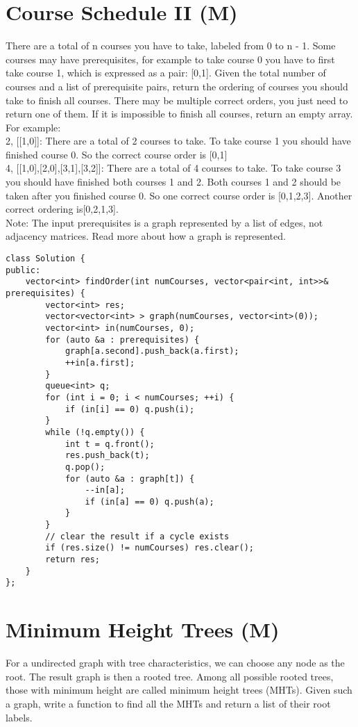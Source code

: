 \section{Course Schedule II (M)}
There are a total of n courses you have to take, labeled from 0 to n - 1. Some courses may have prerequisites, for example to take course 0 you have to first take course 1, which is expressed as a pair: [0,1]. Given the total number of courses and a list of prerequisite pairs, return the ordering of courses you should take to finish all courses. There may be multiple correct orders, you just need to return one of them. If it is impossible to finish all courses, return an empty array.\\

For example:\\
2, [[1,0]]: There are a total of 2 courses to take. To take course 1 you should have finished course 0. So the correct course order is [0,1]\\
4, [[1,0],[2,0],[3,1],[3,2]]: There are a total of 4 courses to take. To take course 3 you should have finished both courses 1 and 2. Both courses 1 and 2 should be taken after you finished course 0. So one correct course order is [0,1,2,3]. Another correct ordering is[0,2,1,3].\\

Note:
The input prerequisites is a graph represented by a list of edges, not adjacency matrices. Read more about how a graph is represented.\\

\begin{lstlisting}
class Solution {
public:
    vector<int> findOrder(int numCourses, vector<pair<int, int>>& prerequisites) {
        vector<int> res;
        vector<vector<int> > graph(numCourses, vector<int>(0));
        vector<int> in(numCourses, 0);
        for (auto &a : prerequisites) {
            graph[a.second].push_back(a.first);
            ++in[a.first];
        }
        queue<int> q;
        for (int i = 0; i < numCourses; ++i) {
            if (in[i] == 0) q.push(i);
        }
        while (!q.empty()) {
            int t = q.front();
            res.push_back(t);
            q.pop();
            for (auto &a : graph[t]) {
                --in[a];
                if (in[a] == 0) q.push(a);
            }
        }
        // clear the result if a cycle exists
        if (res.size() != numCourses) res.clear();
        return res;
    }
};
\end{lstlisting}


\section{Minimum Height Trees (M)}
For a undirected graph with tree characteristics, we can choose any node as the root. The result graph is then a rooted tree. Among all possible rooted trees, those with minimum height are called minimum height trees (MHTs). Given such a graph, write a function to find all the MHTs and return a list of their root labels.\\


